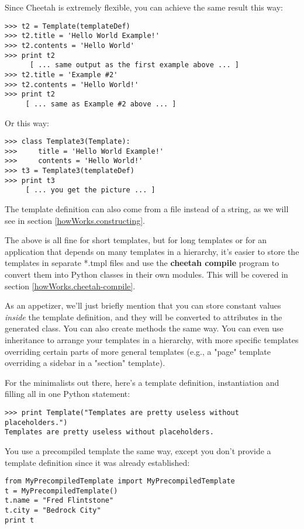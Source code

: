 Since Cheetah is extremely flexible, you can achieve the same result this
way:  

\begin{verbatim}
>>> t2 = Template(templateDef)
>>> t2.title = 'Hello World Example!'
>>> t2.contents = 'Hello World'
>>> print t2
      [ ... same output as the first example above ... ]
>>> t2.title = 'Example #2'
>>> t2.contents = 'Hello World!'
>>> print t2
     [ ... same as Example #2 above ... ]
\end{verbatim}

Or this way:

\begin{verbatim}
>>> class Template3(Template):
>>>     title = 'Hello World Example!'
>>>     contents = 'Hello World!'
>>> t3 = Template3(templateDef)
>>> print t3
     [ ... you get the picture ... ]
\end{verbatim}

The template definition can also come from a file instead of a string,
as we will see in section \ref{howWorks.constructing}.

The above is all fine for short templates, but for long templates or
for an application that depends on many templates in a hierarchy, it's
easier to store the templates in separate *.tmpl files and use the
{\bf cheetah compile} program to convert them into Python classes in
their own modules.  This will be covered in section
\ref{howWorks.cheetah-compile}.  

As an appetizer, we'll just briefly mention that you can store constant values
{\em inside} the template definition, and they will be converted to attributes
in the generated class.  You can also create methods the same way.
You can even use inheritance to arrange your templates in a hierarchy,
with more specific templates overriding certain parts of more general
templates (e.g., a "page" template overriding a sidebar in a "section"
template).

For the minimalists out there, here's a template definition,
instantiation and filling all in one Python statement:

\begin{verbatim}
>>> print Template("Templates are pretty useless without placeholders.")
Templates are pretty useless without placeholders.
\end{verbatim}

You use a precompiled template the same way, except you don't provide
a template definition since it was already established:

\begin{verbatim}
from MyPrecompiledTemplate import MyPrecompiledTemplate
t = MyPrecompiledTemplate()
t.name = "Fred Flintstone"
t.city = "Bedrock City"
print t
\end{verbatim}




